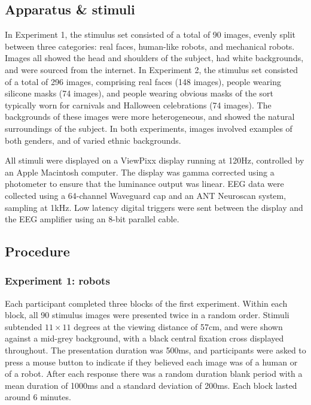 \documentclass[
]{article}
\begin{document}
\hypertarget{apparatus-stimuli}{%
\subsection{Apparatus \& stimuli}\label{apparatus-stimuli}}

In Experiment 1, the stimulus set consisted of a total of 90 images, evenly split between three categories: real faces, human-like robots, and mechanical robots. Images all showed the head and shoulders of the subject, had white backgrounds, and were sourced from the internet. In Experiment 2, the stimulus set consisted of a total of 296 images, comprising real faces (148 images), people wearing silicone masks (74 images), and people wearing obvious masks of the sort typically worn for carnivals and Halloween celebrations (74 images). The backgrounds of these images were more heterogeneous, and showed the natural surroundings of the subject. In both experiments, images involved examples of both genders, and of varied ethnic backgrounds.

All stimuli were displayed on a ViewPixx display running at 120Hz, controlled by an Apple Macintosh computer. The display was gamma corrected using a photometer to ensure that the luminance output was linear. EEG data were collected using a 64-channel Waveguard cap and an ANT Neuroscan system, sampling at 1kHz. Low latency digital triggers were sent between the display and the EEG amplifier using an 8-bit parallel cable.

\hypertarget{procedure}{%
\subsection{Procedure}\label{procedure}}

\hypertarget{experiment-1-robots}{%
\subsubsection{Experiment 1: robots}\label{experiment-1-robots}}

Each participant completed three blocks of the first experiment. Within each block, all 90 stimulus images were presented twice in a random order. Stimuli subtended \(11\times11\) degrees at the viewing distance of 57cm, and were shown against a mid-grey background, with a black central fixation cross displayed throughout. The presentation duration was 500ms, and participants were asked to press a mouse button to indicate if they believed each image was of a human or of a robot. After each response there was a random duration blank period with a mean duration of 1000ms and a standard deviation of 200ms. Each block lasted around 6 minutes.
\end{document}
